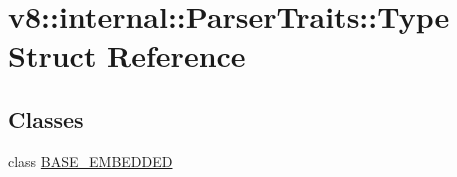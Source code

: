 \hypertarget{structv8_1_1internal_1_1_parser_traits_1_1_type}{}\section{v8\+:\+:internal\+:\+:Parser\+Traits\+:\+:Type Struct Reference}
\label{structv8_1_1internal_1_1_parser_traits_1_1_type}
\subsection*{Classes}
\begin{DoxyCompactItemize}
\item 
class \hyperlink{classv8_1_1internal_1_1_parser_traits_1_1_type_1_1_b_a_s_e___e_m_b_e_d_d_e_d}{B\+A\+S\+E\+\_\+\+E\+M\+B\+E\+D\+D\+E\+D}
\end{DoxyCompactItemize}
